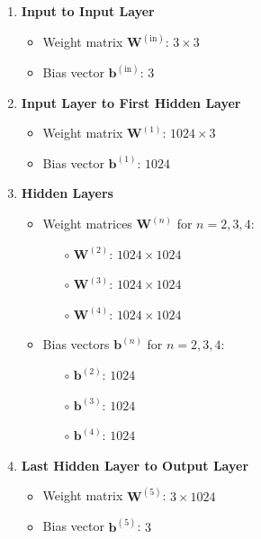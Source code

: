 \documentclass{ioereport}
\begin{document}
\begin{enumerate}[label=\textbf{\roman*.}]
    \item \textbf{Input to Input Layer}
    \begin{itemize}
        \item Weight matrix \( \mathbf{W}^{(\text{in})} \): \( 3 \times 3 \)
        \item Bias vector \( \mathbf{b}^{(\text{in})} \): \( 3 \)
    \end{itemize}
    \item \textbf{Input Layer to First Hidden Layer}
    \begin{itemize}
        \item Weight matrix \( \mathbf{W}^{(\text{1})} \): \( 1024 \times 3 \)
        \item Bias vector \( \mathbf{b}^{(\text{1})} \): \( 1024 \)
    \end{itemize}
    \item \textbf{Hidden Layers}
    \begin{itemize}
        \item Weight matrices \( \mathbf{W}^{(n)} \) for \( n = 2, 3, 4 \):
        \begin{itemize}
            \item[\(\circ\)] \( \mathbf{W}^{(2)} \): \( 1024 \times 1024 \)
            \item[\(\circ\)] \( \mathbf{W}^{(3)} \): \( 1024 \times 1024 \)
            \item[\(\circ\)] \( \mathbf{W}^{(4)} \): \( 1024 \times 1024 \)
        \end{itemize}
        \item Bias vectors \( \mathbf{b}^{(n)} \) for \( n = 2, 3, 4 \):
        \begin{itemize}
            \item[\(\circ\)] \( \mathbf{b}^{(2)} \): \( 1024 \)
            \item[\(\circ\)] \( \mathbf{b}^{(3)} \): \( 1024 \)
            \item[\(\circ\)] \( \mathbf{b}^{(4)} \): \( 1024 \)
        \end{itemize}
    \end{itemize}
    \item \textbf{Last Hidden Layer to Output Layer}
    \begin{itemize}
        \item Weight matrix \( \mathbf{W}^{(\text{5})} \): \( 3 \times 1024 \)
        \item Bias vector \( \mathbf{b}^{(\text{5})} \): \( 3 \)
    \end{itemize}
\end{enumerate}
\end{document}
